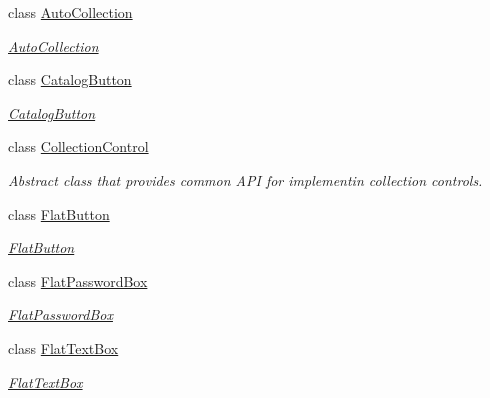 \begin{DoxyCompactItemize}
\item 
class \mbox{\hyperlink{class_wpf_handler_1_1_u_i_1_1_controls_1_1_auto_collection}{Auto\+Collection}}
\begin{DoxyCompactList}\small\item\em \mbox{\hyperlink{class_wpf_handler_1_1_u_i_1_1_controls_1_1_auto_collection}{Auto\+Collection}} \end{DoxyCompactList}\item 
class \mbox{\hyperlink{class_wpf_handler_1_1_u_i_1_1_controls_1_1_catalog_button}{Catalog\+Button}}
\begin{DoxyCompactList}\small\item\em \mbox{\hyperlink{class_wpf_handler_1_1_u_i_1_1_controls_1_1_catalog_button}{Catalog\+Button}} \end{DoxyCompactList}\item 
class \mbox{\hyperlink{class_wpf_handler_1_1_u_i_1_1_controls_1_1_collection_control}{Collection\+Control}}
\begin{DoxyCompactList}\small\item\em Abstract class that provides common A\+PI for implementin collection controls. \end{DoxyCompactList}\item 
class \mbox{\hyperlink{class_wpf_handler_1_1_u_i_1_1_controls_1_1_flat_button}{Flat\+Button}}
\begin{DoxyCompactList}\small\item\em \mbox{\hyperlink{class_wpf_handler_1_1_u_i_1_1_controls_1_1_flat_button}{Flat\+Button}} \end{DoxyCompactList}\item 
class \mbox{\hyperlink{class_wpf_handler_1_1_u_i_1_1_controls_1_1_flat_password_box}{Flat\+Password\+Box}}
\begin{DoxyCompactList}\small\item\em \mbox{\hyperlink{class_wpf_handler_1_1_u_i_1_1_controls_1_1_flat_password_box}{Flat\+Password\+Box}} \end{DoxyCompactList}\item 
class \mbox{\hyperlink{class_wpf_handler_1_1_u_i_1_1_controls_1_1_flat_text_box}{Flat\+Text\+Box}}
\begin{DoxyCompactList}\small\item\em \mbox{\hyperlink{class_wpf_handler_1_1_u_i_1_1_controls_1_1_flat_text_box}{Flat\+Text\+Box}} \end{DoxyCompactList}\item 

\end{DoxyCompactItemize}
